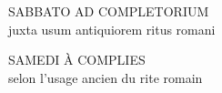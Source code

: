 \documentclass[twoside]{article}
\begin{document}
\null \newpage

\sloppy

\begin{paracol}[1]{2}

\begin{center}\begin{doublespace}

{
\MakeUppercase{\Large Sabbato ad Completorium}\\
juxta usum antiquiorem ritus romani}
\end{doublespace}\end{center}

\switchcolumn

\begin{center}\begin{doublespace}
{
\MakeUppercase{\Large Samedi à Complies}\\
selon l'usage ancien du rite romain
}
\end{doublespace}\end{center}

\switchcolumn*




\end{paracol}
\end{document}

